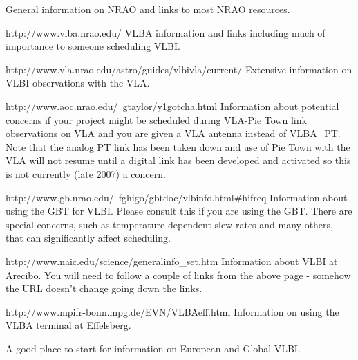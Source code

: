\documentclass{report}
\begin{document}
\begin{list}{}{\parsep 0em  \itemsep 0em }

\item {}  General
information on NRAO and links to most NRAO resources.

\item {}
{http://www.vlba.nrao.edu/}  VLBA information and links
including much of importance to someone scheduling VLBI.

\item {}
{http://www.vla.nrao.edu/astro/guides/vlbivla/current/} Extensive
information on VLBI observations with the VLA.

\item {}
{http://www.aoc.nrao.edu/~gtaylor/y1gotcha.html} Information about
potential concerns if your project might be scheduled during VLA-Pie Town
link observations on VLA and you are given a VLA antenna instead of
VLBA\_PT.  Note that the analog PT link has been taken down and use of
Pie Town with the VLA will not resume until a digital link has been
developed and activated so this is not currently (late 2007) a concern.

\item {}
{http://www.gb.nrao.edu/~fghigo/gbtdoc/vlbinfo.html\#hifreq}
Information about using the GBT for VLBI.  Please consult this
if you are using the GBT.  There are special concerns, such as temperature
dependent slew rates and many others, that can significantly affect
scheduling.

\item {}
{http://www.naic.edu/science/generalinfo_set.htm}
Information about VLBI at Arecibo.  You will need to follow a couple
of links from the above page - somehow the URL doesn't change going
down the links.

\item {}
{http://www.mpifr-bonn.mpg.de/EVN/VLBAeff.html}  Information on using
the VLBA terminal at Effelsberg.



\item {}  A good
place to start for information on European and Global VLBI.

\end{list}
\end{document}

